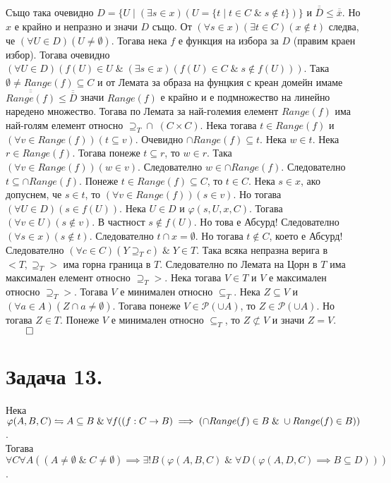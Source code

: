 \documentclass[12pt]{article}
\begin{document}
Също така очевидно \(D = \{U \; | \; (\exists s \in x)(U = \{t \; | \; t \in C \; \& \; s \notin t \}) \}\) и \(\overline{\overline{D}} \leq \overline{\overline{x}}\).
Но \(x\) е крайно и непразно и значи \(D\) също. От \((\forall s \in x)(\exists t \in C)(x \notin t)\) следва, че \((\forall U \in D)(U \neq \emptyset)\).
Тогава нека \(f\) е функция на избора за \(D\) (правим краен избор).
Тогава очевидно \((\forall U \in D)(f(U) \in U \; \& \; (\exists s \in x)(f(U) \in C \; \& \; s \notin f(U)))\). Така \(\emptyset \neq Range(f) \subseteq C\) и от Лемата за образа на фунцкия с креан домейн имаме \(\overline{\overline{Range(f)}} \leq \overline{\overline{D}}\) значи \(Range(f)\) е крайно и е подмножество на линейно наредено множество. 
Тогава по Лемата за най-големия елемент \(Range(f)\) има най-голям елемент относно \(\supseteq_T \cap \; (C \times C)\).
Нека тогава \(t \in Range(f)\) и \((\forall v \in Range(f))(t \subseteq v)\).
Очевидно \(\cap Range(f) \subseteq t\).
Нека \(w \in t\). Нека \(r \in Range(f)\).
Тогава понеже \(t \subseteq r\), то \(w \in r\).
Така \((\forall v \in Range(f))(w \in v)\).
Следователно \(w \in \cap Range(f)\).
Следователно \(t \subseteq \cap Range(f)\).
Понеже \(t \in Range(f) \subseteq C\), то \(t \in C\).
Нека \(s \in x\), ако допуснем, че \(s \in t\),
то \((\forall v \in Range(f))(s \in v)\).
Но тогава \((\forall U \in D)(s \in f(U))\).
Нека \(U \in D\) и \(\varphi(s, U, x, C)\).
Тогава \((\forall v \in U)(s \notin v)\).
В частност \(s \notin f(U)\). Но това е Абсурд!
Следователно \((\forall s \in x)(s \notin t)\).
Следователно \(t \cap x = \emptyset\).
Но тогава \(t \notin C\), което е Абсурд!
Следователно \((\forall c \in C)(Y \supseteq_T c) \; \& \; Y \in T\).
Така всяка непразна верига в \(<T, \supseteq_T>\) има горна граница в \(T\).
Следователно по Лемата на Цорн в \(T\) има максимален елемент относно \(\supseteq_T>\).
Нека тогава \(V \in T\) и \(V\) е максимален относно \(\supseteq_T>\).
Тогава \(V\) е минимален относно \(\subseteq_T\).
Нека \(Z \subseteq V\) и \((\forall a \in A)(Z \cap a \neq \emptyset)\).
Тогава понеже \(V \in \mathcal{P}(\cup A)\), то \(Z \in \mathcal{P}(\cup A)\).
Но тогава \(Z \in T\). Понеже \(V\) е минимален относно \(\subseteq_T\),
то \(Z \not\subset V\) и значи \(Z = V\). \(\qed\)

\section*{Задача 13.}
Нека \(\varphi(A, B, C) \leftrightharpoons \\
A \subseteq B \; \& \; \forall f((f : C \to B) \implies (\cap Range(f) \in B \; \& \; \cup Range(f) \in B))\). \\
Тогава
\(\forall C \forall A ((A \neq \emptyset \; \& \; C \neq \emptyset) \implies \exists! B (\varphi(A, B, C) \; \& \; \forall D (\varphi(A, D, C) \implies B \subseteq D)))\).
\end{document}
